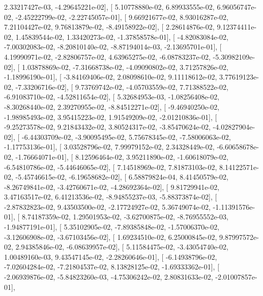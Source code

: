 \documentclass{article}
\begin{document}
          2.33217427e-03,  -4.29645221e-02],
       [  5.10778880e-02,   6.89933555e-02,   6.96056747e-02,
         -2.45222799e-02,  -2.22745057e-01],
       [  9.66921677e-02,   8.93016287e-02,   7.21104427e-02,
          9.76813879e-02,  -8.49158922e-02],
       [  2.28614876e-02,   9.12374411e-02,   1.45839544e-02,
          1.33420273e-02,  -1.37858578e-01],
       [ -4.82083084e-02,  -7.00302083e-02,  -8.20810140e-02,
         -8.87194014e-03,  -2.13695701e-01],
       [  4.19990971e-02,  -2.82806757e-02,   4.63965275e-02,
         -6.08783237e-02,  -5.30982109e-02],
       [  1.03878869e-02,  -7.31668738e-02,  -4.09090802e-02,
          3.71257826e-02,  -1.18996190e-01],
       [ -3.84169406e-02,   2.08098610e-02,   9.11118612e-02,
          3.77619123e-02,  -7.33206716e-02],
       [  9.73769742e-02,  -4.05703559e-02,   7.71388522e-02,
         -6.91083710e-02,  -4.52811654e-02],
       [  5.32684953e-03,  -1.08256408e-02,  -8.30268440e-02,
          2.39270955e-02,  -8.84512271e-02],
       [ -9.46940250e-02,  -1.98985493e-02,   3.95415223e-02,
          1.91549209e-02,  -2.01210836e-01],
       [ -9.25273578e-02,   9.21843432e-02,   3.80524317e-02,
         -3.85470624e-02,  -4.02827904e-02],
       [ -6.44303709e-02,  -3.90095495e-02,   5.75678345e-02,
         -7.58006063e-02,  -1.17753136e-01],
       [  3.03528796e-02,   7.99979152e-02,   2.34328449e-02,
         -6.60658678e-02,  -1.76664071e-01],
       [  8.12596464e-02,   3.95211890e-02,  -1.60618079e-02,
         -6.54810786e-02,  -5.44646065e-02],
       [  7.14518969e-02,   7.81873103e-02,   8.14122571e-02,
         -5.45746615e-02,  -6.19658682e-02],
       [  6.58879824e-04,   8.41450579e-02,  -8.26749841e-02,
         -3.42760671e-02,  -4.28692364e-02],
       [  9.81729941e-02,   3.47163517e-02,   6.41213536e-02,
         -8.94855237e-03,  -5.88373874e-02],
       [ -2.87832823e-02,   9.43503500e-02,  -2.17724927e-02,
          5.36749074e-02,  -1.11391576e-01],
       [  8.74187359e-02,   1.29501953e-02,  -3.62700875e-02,
         -8.76955552e-03,  -1.94877191e-01],
       [  5.35102905e-02,  -7.89385848e-02,  -1.57006370e-02,
         -3.12606908e-02,  -3.67103456e-02],
       [  1.69234510e-02,   6.25000845e-02,   9.87997572e-02,
          2.94385846e-02,  -6.08639957e-02],
       [  5.11584475e-02,  -3.43054740e-02,   1.00489160e-03,
          9.43547145e-02,  -2.28260646e-01],
       [ -6.14938796e-02,  -7.02604284e-02,  -7.21804537e-02,
          8.13828125e-02,  -1.69333362e-01],
       [ -2.06939876e-02,  -5.84823260e-03,  -4.75306242e-02,
          2.80831633e-02,  -2.01007857e-01],
\end{document}

